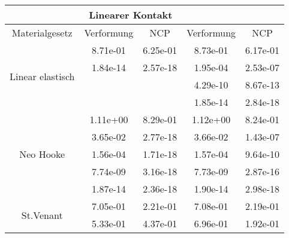 \begin{table} 
\centering 
\begin{tabular}{c|cc|cc|} 
\cline{2-5} 
 & \multicolumn{2}{|c|}{Linearer Kontakt} &  \\ 
\hline 
\multicolumn{1}{|c|}{Materialgesetz} & \multicolumn{1}{c|}{Verformung} & \multicolumn{1}{c|}{NCP} & \multicolumn{1}{c|}{Verformung} & \multicolumn{1}{c|}{NCP} \\ 
\hline 
\multicolumn{1}{|c|}{\multirow{4}{*}{Linear elastisch}} &\multicolumn{1}{|c|}{  8.71e-01} & \multicolumn{1}{|c|}{  6.25e-01} & \multicolumn{1}{|c|}{  8.73e-01} & \multicolumn{1}{|c|}{  6.17e-01} \\ 
\multicolumn{1}{|c|}{} & \multicolumn{1}{|c|}{  1.84e-14} & \multicolumn{1}{|c|}{  2.57e-18} & \multicolumn{1}{|c|}{  1.95e-04} & \multicolumn{1}{|c|}{  2.53e-07} \\ 
\multicolumn{1}{|c|}{} & \multicolumn{1}{|c|}{} & \multicolumn{1}{|c|}{} & \multicolumn{1}{|c|}{  4.29e-10} & \multicolumn{1}{|c|}{  8.67e-13} \\ 
\multicolumn{1}{|c|}{} & \multicolumn{1}{|c|}{} & \multicolumn{1}{|c|}{} & \multicolumn{1}{|c|}{  1.85e-14} & \multicolumn{1}{|c|}{  2.84e-18} \\ 
\hline 
\multicolumn{1}{|c|}{\multirow{5}{*}{Neo Hooke}} &\multicolumn{1}{|c|}{  1.11e+00} & \multicolumn{1}{|c|}{  8.29e-01} & \multicolumn{1}{|c|}{  1.12e+00} & \multicolumn{1}{|c|}{  8.24e-01} \\ 
\multicolumn{1}{|c|}{} & \multicolumn{1}{|c|}{  3.65e-02} & \multicolumn{1}{|c|}{  2.77e-18} & \multicolumn{1}{|c|}{  3.66e-02} & \multicolumn{1}{|c|}{  1.43e-07} \\ 
\multicolumn{1}{|c|}{} & \multicolumn{1}{|c|}{  1.56e-04} & \multicolumn{1}{|c|}{  1.71e-18} & \multicolumn{1}{|c|}{  1.57e-04} & \multicolumn{1}{|c|}{  9.64e-10} \\ 
\multicolumn{1}{|c|}{} & \multicolumn{1}{|c|}{  7.74e-09} & \multicolumn{1}{|c|}{  3.16e-18} & \multicolumn{1}{|c|}{  7.73e-09} & \multicolumn{1}{|c|}{  2.87e-16} \\ 
\multicolumn{1}{|c|}{} & \multicolumn{1}{|c|}{  1.87e-14} & \multicolumn{1}{|c|}{  2.36e-18} & \multicolumn{1}{|c|}{  1.90e-14} & \multicolumn{1}{|c|}{  2.98e-18} \\ 
\hline 
\multicolumn{1}{|c|}{\multirow{91}{*}{St.Venant}} &\multicolumn{1}{|c|}{  7.05e-01} & \multicolumn{1}{|c|}{  2.21e-01} & \multicolumn{1}{|c|}{  7.08e-01} & \multicolumn{1}{|c|}{  2.19e-01} \\ 
\multicolumn{1}{|c|}{} & \multicolumn{1}{|c|}{  5.33e-01} & \multicolumn{1}{|c|}{  4.37e-01} & \multicolumn{1}{|c|}{  6.96e-01} & \multicolumn{1}{|c|}{  1.92e-01} \\ 

\end{tabular}
\end{table}
